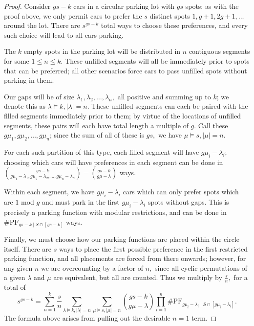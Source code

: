 \documentclass[12 pt]{amsart}
\theoremstyle{definition} %
\theoremstyle{remark} %
\begin{document}
\begin{proof}
    Consider $gs-k$ cars in a circular parking lot with $gs$ spots; as with the proof above, we only permit cars to prefer the $s$ distinct spots $1,g+1,2g+1,\ldots$ around the lot. There are $s^{gs-k}$ total ways to choose these preferences, and every such choice will lead to all cars parking.

    The $k$ empty spots in the parking lot will be distributed in $n$ contiguous segments for some $1\le n\le k.$ These unfilled segments will all be immediately prior to spots that can be preferred; all other scenarios force cars to pass unfilled spots without parking in them.

    Our gaps will be of size $\lambda_1,\lambda_2,\ldots,\lambda_n,$ all positive and summing up to $k$; we denote this as $\lambda\vDash k,|\lambda|=n.$ These unfilled segments can each be paired with the filled segments immediately prior to them; by virtue of the locations of unfilled segments, these pairs will each have total length a multiple of $g.$ Call these $g\mu_1,g\mu_2,\ldots,g\mu_n$; since the sum of all of these is $gs,$ we have $\mu\vDash s,|\mu|=n.$

    For each such partition of this type, each filled segment will have $g\mu_i-\lambda_i$; choosing which cars will have preferences in each segment can be done in $\binom{gs - k}{g \mu_1 - \lambda_1,g \mu_2 - \lambda_2,\ldots,g \mu_n - \lambda_n}=\binom{gs - k}{g \mu - \lambda}$ ways.
    
    Within each segment, we have $g\mu_i-\lambda_i$ cars which can only prefer spots which are $1$ mod $g$ and must park in the first $g\mu_i-\lambda_i$ spots without gaps. This is precisely a parking function with modular restrictions, and can be done in $\# \mathrm{PF}_{gs - k \mid S \cap [gs - k]}$ ways.

    Finally, we must choose how our parking functions are placed within the circle itself. There are $s$ ways to place the first possible preference in the first restricted parking function, and all placements are forced from there onwards; however, for any given $n$ we are overcounting by a factor of $n,$ since all cyclic permutations of a given $\lambda$ and $\mu$ are equivalent, but all are counted. Thus we multiply by $\frac{s}{n},$ for a total of 
    \[
	    s^{gs - k} = \sum_{n = 1}^{k} \frac{s}{n} \sum_{\lambda \vDash k, \lvert \lambda \rvert = n} \sum_{\mu \vDash s, \lvert \mu \rvert = n} \binom{gs - k}{g \mu - \lambda} \prod_{i = 1}^{n} \# \mathrm{PF}_{g \mu_{i} - \lambda_{i} \mid S \cap [g \mu_{i} - \lambda_{i}]}.
    \]
    The formula above arises from pulling out the desirable $n = 1$ term.
\end{proof}
\end{document}
